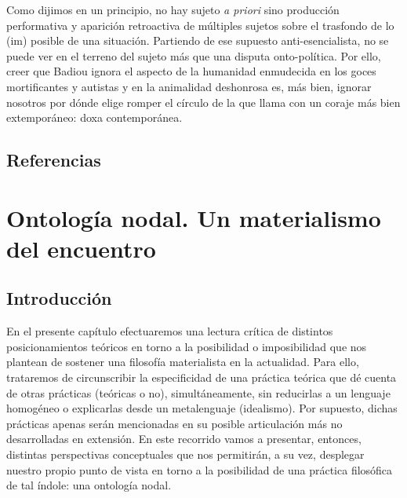 Como dijimos en un principio, no hay sujeto \emph{a priori} sino producción performativa y aparición retroactiva de múltiples sujetos sobre el trasfondo de lo (im) posible de una situación. Partiendo de ese supuesto anti-esencialista, no se puede ver en el terreno del sujeto más que una disputa onto-política. Por ello, creer que Badiou ignora el aspecto de la humanidad enmudecida en los goces mortificantes y autistas y en la animalidad deshonrosa es, más bien, ignorar nosotros por dónde elige romper el círculo de la que llama con un coraje más bien extemporáneo: doxa contemporánea.


\section*{Referencias}
\printbibliography[heading=none]   %

\chapter{Ontología nodal. Un materialismo del encuentro}


\section{Introducción}

En el presente capítulo efectuaremos una lectura crítica de distintos posicionamientos teóricos en torno a la posibilidad o imposibilidad que nos plantean de sostener una filosofía materialista en la actualidad. Para ello, trataremos de circunscribir la especificidad de una práctica teórica que dé cuenta de otras prácticas (teóricas o no), simultáneamente, sin reducirlas a un lenguaje homogéneo o explicarlas desde un metalenguaje (idealismo). Por supuesto, dichas prácticas apenas serán mencionadas en su posible articulación más no desarrolladas en extensión. En este recorrido vamos a presentar, entonces, distintas perspectivas conceptuales que nos permitirán, a su vez, desplegar nuestro propio punto de vista en torno a la posibilidad de una práctica filosófica de tal índole: una ontología nodal.

